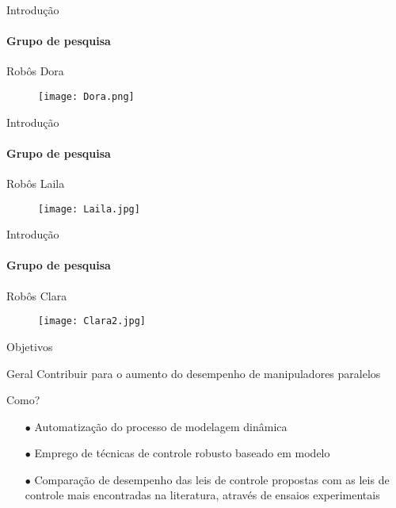 \documentclass[25pt,landscape]{beamer}
\begin{document}
\begin{frame}{Introdução}
	\framesubtitle{Grupo de pesquisa}
	\begin{block}{Rob\^os}
		Dora
    \end{block}
    \begin{figure}[!h]
        \centering
        \texttt{[image: Dora.png]}
    \end{figure}
\end{frame}

\begin{frame}{Introdução}
	\framesubtitle{Grupo de pesquisa}
	\begin{block}{Rob\^os}
		Laila
    \end{block}
    \begin{figure}[!h]
        \centering
        \texttt{[image: Laila.jpg]}
    \end{figure}
\end{frame}

\begin{frame}{Introdução}
	\framesubtitle{Grupo de pesquisa}
	\begin{block}{Rob\^os}
		Clara
    \end{block}
    \begin{figure}[!h]
        \centering
        \texttt{[image: Clara2.jpg]}
    \end{figure}
\end{frame}

\begin{frame}{Objetivos}
	\begin{block}{Geral}
		Contribuir para o aumento do desempenho de manipuladores paralelos
	\end{block}
	\begin{exampleblock}{Como?}
		\begin{itemize}
			\item[$\bullet$] Automatização do processo de modelagem dinâmica \\[8pt]
			\item[$\bullet$] Emprego de técnicas de controle robusto baseado em modelo \\[8pt]
			\item[$\bullet$] Compara\c{c}\~ao de desempenho das leis de controle propostas com as leis de controle mais encontradas na literatura, atrav\'es de ensaios experimentais \\[8pt]
		\end{itemize}
	\end{exampleblock}
\end{frame}
\end{document}
